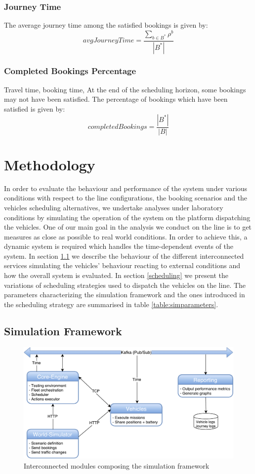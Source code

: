\documentclass[12pt,a4paper]{article}
\begin{document}
\subsubsection*{Journey Time}
The average journey time among the satisfied bookings is given by:
$$avgJourneyTime = \frac{\sum_{b \in B^{*}}\rho^{b}}{|B^{*}|} $$

\subsubsection*{Completed Bookings Percentage}
Travel time, booking time, 
At the end of the scheduling horizon, some bookings may not have been satisfied. The percentage of bookings which have been satisfied is given by:
$$completedBookings = \frac{|B^{*}|}{|B|}$$

\section{Methodology}
In order to evaluate the behaviour and performance of the system under various conditions with respect to the line configurations, the booking scenarios and the vehicles scheduling alternatives, we undertake analyses under laboratory conditions by simulating the operation of the system on the platform dispatching the vehicles. One of our main goal in the analysis we conduct on the line is to get measures as close as possible to real world conditions. In order to achieve this, a dynamic system is required which handles the time-dependent events of the system. In section \ref{framework} we describe the behaviour of the different interconnected services simulating the vehicles' behaviour reacting to external conditions and how the overall system is evaluated. In section \ref{scheduling} we present the variations of scheduling strategies used to dispatch the vehicles on the line. The parameters characterizing the simulation framework and the ones introduced in the scheduling strategy are summarised in table \ref{table:simparameters}. 

\subsection{Simulation Framework}\label{framework}
\setlength{\belowcaptionskip}{10pt}
\begin{figure}[h] 
  \centering
\includegraphics[scale=0.55]{./images/SimulationFramework2.pdf}
\caption{Interconnected modules composing the simulation framework}
\label{fig:simulationFramework}
\end{figure}
\end{document}
